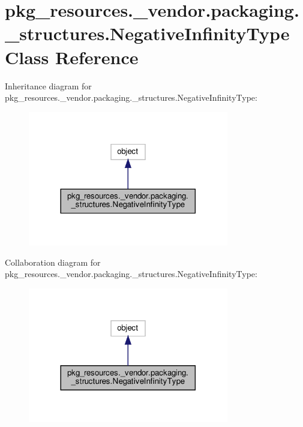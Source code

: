 \hypertarget{classpkg__resources_1_1__vendor_1_1packaging_1_1__structures_1_1NegativeInfinityType}{}\section{pkg\+\_\+resources.\+\_\+vendor.\+packaging.\+\_\+structures.\+Negative\+Infinity\+Type Class Reference}
\label{classpkg__resources_1_1__vendor_1_1packaging_1_1__structures_1_1NegativeInfinityType}


Inheritance diagram for pkg\+\_\+resources.\+\_\+vendor.\+packaging.\+\_\+structures.\+Negative\+Infinity\+Type\+:
\nopagebreak
\begin{figure}[H]
\begin{center}
\leavevmode
\includegraphics[width=248pt]{classpkg__resources_1_1__vendor_1_1packaging_1_1__structures_1_1NegativeInfinityType__inherit__graph}
\end{center}
\end{figure}


Collaboration diagram for pkg\+\_\+resources.\+\_\+vendor.\+packaging.\+\_\+structures.\+Negative\+Infinity\+Type\+:
\nopagebreak
\begin{figure}[H]
\begin{center}
\leavevmode
\includegraphics[width=248pt]{classpkg__resources_1_1__vendor_1_1packaging_1_1__structures_1_1NegativeInfinityType__coll__graph}
\end{center}
\end{figure}
